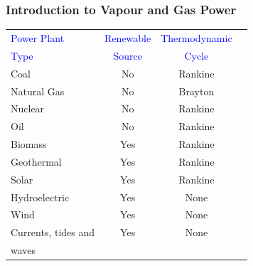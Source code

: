 \documentclass[10pt,compress]{beamer}
\begin{document}
\begin{frame}
 \frametitle{Introduction to Vapour and Gas Power}

    \begin{center}
     \begin{table}
       \begin{tabular}{l c c c}
    \hline
    \textcolor{blue}{Power Plant} & \textcolor{blue}{Renewable}  & \textcolor{blue}{Thermodynamic} \\
    \textcolor{blue}{Type}        & \textcolor{blue}{Source}     & \textcolor{blue}{Cycle}         \\
    \hline
      Coal                        &   No                         & Rankine  \\
      Natural Gas                 &   No                         & Brayton  \\
      Nuclear                     &   No                         & Rankine  \\
      Oil                         &   No                         & Rankine  \\
      Biomass                     &   Yes                        & Rankine  \\
      Geothermal                  &   Yes                        & Rankine  \\
      Solar                       &   Yes                        & Rankine  \\
      Hydroelectric               &   Yes                        & None     \\
      Wind                        &   Yes                        & None     \\
      Currents, tides and         &   Yes                        & None     \\
      waves                       &                              &          \\
      \end{tabular}
     \end{table}
    \end{center}
\end{frame}
\end{document}
